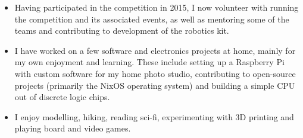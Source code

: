 
\begin{itemize}
  \item Having participated in the \studentrobotics{} competition in 2015, I now volunteer with running the competition and its associated events, as well as mentoring some of the teams and contributing to development of the robotics kit.
  \item I have worked on a few software and electronics projects at home, mainly for my own enjoyment and learning. These include setting up a Raspberry Pi with custom software for my home photo studio, contributing to open-source projects (primarily the NixOS operating system) and building a simple CPU out of discrete logic chips.
  \item I enjoy modelling, hiking, reading sci-fi, experimenting with 3D printing and playing board and video games.
\end{itemize}
